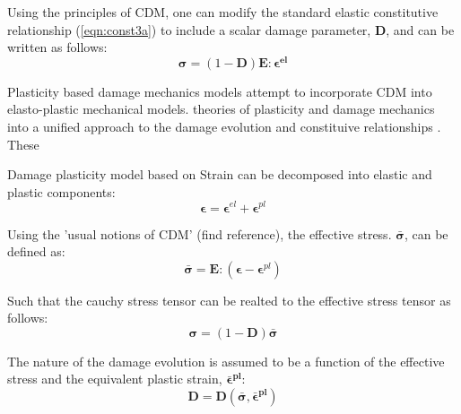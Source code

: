 Using the principles of CDM, one can modify the standard elastic constitutive relationship (\ref{eqn:const3a}) to include a scalar damage parameter, $\mathbf{D}$, and can be written as follows: 
\begin{equation}
\boldsymbol{\sigma}=(1-\mathbf{D})\mathbf{E}:\boldsymbol{\epsilon^{el}}\label{eqn:const3}
\end{equation}


Plasticity based damage mechanics models attempt to incorporate CDM into elasto-plastic mechanical models. 
theories of plasticity and damage mechanics into a unified approach to the damage evolution and constituive relationships \cite{zhang_continuum_2010}. These 

Damage plasticity model based on Strain can be decomposed into elastic
and plastic components: 
\begin{equation}
\boldsymbol{\epsilon}=\boldsymbol{\epsilon}^{el}+\boldsymbol{\epsilon}^{pl}\label{eqn:const1}
\end{equation}




Using the 'usual notions of CDM' (find
reference), the effective stress. $\boldsymbol{\bar{\sigma}}$, can
be defined as: 
\begin{equation}
\boldsymbol{\bar{\sigma}}=\mathbf{E}:(\boldsymbol{\epsilon}-\boldsymbol{\epsilon}^{pl})\label{eqn:const6}
\end{equation}


Such that the cauchy stress tensor can be realted to the effective
stress tensor as follows: 
\begin{equation}
\boldsymbol{\sigma}=(1-\mathbf{D})\boldsymbol{\bar{\sigma}}\label{eqn:const7}
\end{equation}


The nature of the damage evolution is assumed to be a function of
the effective stress and the equivalent plastic strain, $\boldsymbol{\bar{\epsilon}^{pl}}$:
\begin{equation}
\mathbf{D}=\mathbf{D}(\boldsymbol{\bar{\sigma}},\boldsymbol{\bar{\epsilon}^{pl}})\label{eqn:const8}
\end{equation}